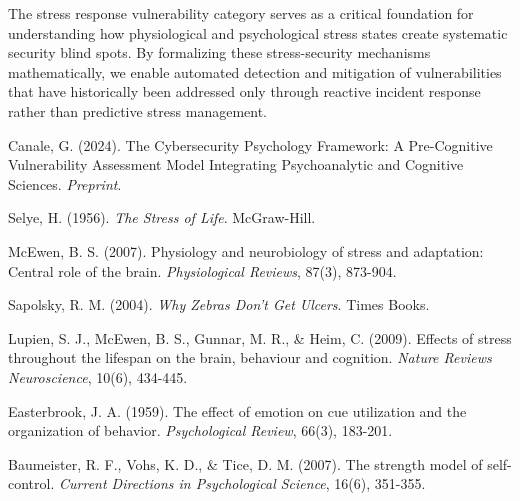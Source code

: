 \documentclass[11pt,a4paper]{article}
\begin{document}
The stress response vulnerability category serves as a critical foundation for understanding how physiological and psychological stress states create systematic security blind spots. By formalizing these stress-security mechanisms mathematically, we enable automated detection and mitigation of vulnerabilities that have historically been addressed only through reactive incident response rather than predictive stress management.

\begin{thebibliography}{9}

Canale, G. (2024). The Cybersecurity Psychology Framework: A Pre-Cognitive Vulnerability Assessment Model Integrating Psychoanalytic and Cognitive Sciences. \textit{Preprint}.

Selye, H. (1956). \textit{The Stress of Life}. McGraw-Hill.

McEwen, B. S. (2007). Physiology and neurobiology of stress and adaptation: Central role of the brain. \textit{Physiological Reviews}, 87(3), 873-904.

Sapolsky, R. M. (2004). \textit{Why Zebras Don't Get Ulcers}. Times Books.

Lupien, S. J., McEwen, B. S., Gunnar, M. R., \& Heim, C. (2009). Effects of stress throughout the lifespan on the brain, behaviour and cognition. \textit{Nature Reviews Neuroscience}, 10(6), 434-445.

Easterbrook, J. A. (1959). The effect of emotion on cue utilization and the organization of behavior. \textit{Psychological Review}, 66(3), 183-201.

Baumeister, R. F., Vohs, K. D., \& Tice, D. M. (2007). The strength model of self-control. \textit{Current Directions in Psychological Science}, 16(6), 351-355.

\end{thebibliography}
\end{document}
